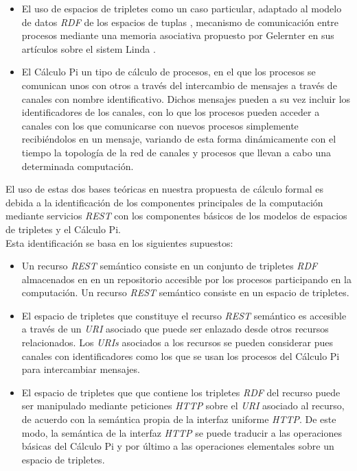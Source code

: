 \begin{itemize}
\item El uso de espacios de tripletes \cite{fensel2004triple} como un caso particular, adaptado al modelo de datos \textit{RDF} de los espacios de tuplas \cite{bussler2005minimal}, mecanismo de comunicaci\'on entre procesos mediante una memoria asociativa propuesto por Gelernter en sus art\'iculos sobre el sistem Linda \cite{linda}.

\item El C\'alculo Pi \cite{pi_calculus} un tipo de c\'alculo de procesos, en el que los procesos se comunican unos con otros a trav\'es del intercambio de mensajes a trav\'es de canales con nombre identificativo. Dichos mensajes pueden a su vez incluir los identificadores de los canales, con lo que los procesos pueden acceder a canales con los que comunicarse con nuevos procesos simplemente recibi\'endolos en un mensaje, variando de esta forma din\'amicamente con el tiempo la topolog\'ia de la red de canales y procesos que llevan a cabo una determinada computaci\'on.
\end{itemize}

El uso de estas dos bases te\'oricas en nuestra propuesta de c\'alculo formal es debida a la identificaci\'on de los componentes principales de la computaci\'on mediante servicios \textit{REST} con los componentes b\'asicos de los modelos de espacios de tripletes y el C\'alculo Pi.\\

Esta identificaci\'on se basa en los siguientes supuestos:
\begin{itemize}

\item Un recurso \textit{REST} sem\'antico consiste en un conjunto de tripletes \textit{RDF} almacenados en en un repositorio accesible por los procesos participando en la computaci\'on. Un recurso \textit{REST} sem\'antico consiste en un espacio de tripletes.

\item El espacio de tripletes que constituye el recurso \textit{REST} sem\'antico es accesible a trav\'es de un \textit{URI} asociado que puede ser enlazado desde otros recursos relacionados. Los \textit{URIs} asociados a los recursos se pueden considerar pues canales con identificadores como los que se usan los procesos del C\'alculo Pi para intercambiar mensajes.

\item El espacio de tripletes que que contiene los tripletes \textit{RDF} del recurso puede ser manipulado mediante peticiones \textit{HTTP} sobre el \textit{URI} asociado al recurso, de acuerdo con la sem\'antica propia de la interfaz uniforme \textit{HTTP}. De este modo, la sem\'antica de la interfaz \textit{HTTP} se puede traducir a las operaciones b\'asicas del C\'alculo Pi y por \'ultimo a las operaciones elementales sobre un espacio de tripletes.

\end{itemize}

